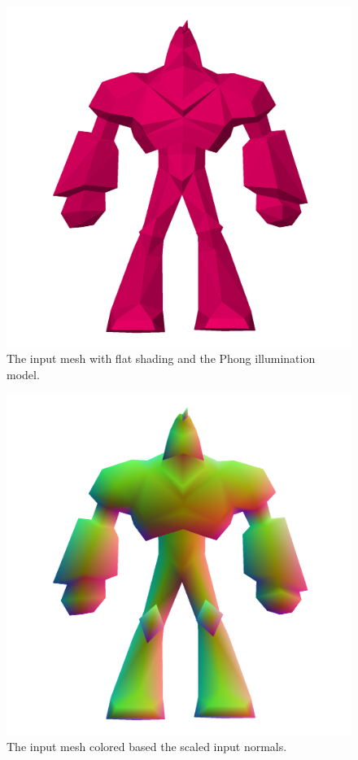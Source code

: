 \documentclass[a4paper,10pt]{article}
\begin{document}
\begin{figure}
	\includegraphics[width=\textwidth]{enforcer_flat_phong.png}
	\caption{The input mesh with flat shading and the Phong illumination model.}	
\end{figure}

\begin{figure}
	\includegraphics[width=\textwidth]{enforcer_normals.png}
	\caption{The input mesh colored based the scaled input normals.}		
	\label{fig:enforcerNormals}	
\end{figure}
\end{document}
